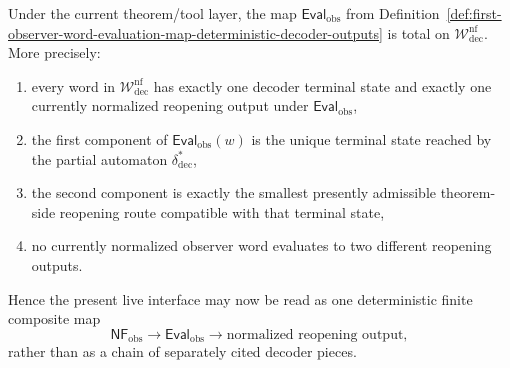 \begin{proposition}
\label{prop:observer-word-evaluation-map-total-current-normal-form-language}
Under the current theorem/tool layer, the map \(\mathsf{Eval}_{\mathrm{obs}}\) from Definition~\ref{def:first-observer-word-evaluation-map-deterministic-decoder-outputs} is total on \(\mathcal W^{\mathrm{nf}}_{\mathrm{dec}}\). More precisely:
\begin{enumerate}[label=(\roman*)]
 \item every word in \(\mathcal W^{\mathrm{nf}}_{\mathrm{dec}}\) has exactly one decoder terminal state and exactly one currently normalized reopening output under \(\mathsf{Eval}_{\mathrm{obs}}\),
 \item the first component of \(\mathsf{Eval}_{\mathrm{obs}}(w)\) is the unique terminal state reached by the partial automaton \(\delta^{\ast}_{\mathrm{dec}}\),
 \item the second component is exactly the smallest presently admissible theorem-side reopening route compatible with that terminal state,
 \item no currently normalized observer word evaluates to two different reopening outputs.
\end{enumerate}
Hence the present live interface may now be read as one deterministic finite composite map
\[
\mathsf{NF}_{\mathrm{obs}}
\longrightarrow
\mathsf{Eval}_{\mathrm{obs}}
\longrightarrow
\text{normalized reopening output},
\]
rather than as a chain of separately cited decoder pieces.
\end{proposition}

